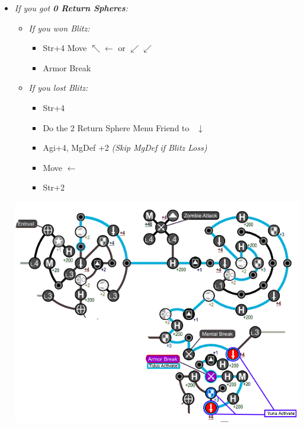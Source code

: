 \begin{spheregrid}
\begin{multicols}{2}
\begin{itemize}
\begin{itemize}
        \item \textit{If you got \textbf{0 Return Spheres}:}
              \begin{itemize}
              \item \textit{If you won Blitz:}
              \begin{itemize}
                \tidusf Move to Str+4 by Mental Break $\rightarrow x3, \downarrow, \rightarrow x3$
                \yunaf Friend Sphere to \tidus
                \item Str+4
                \tidusf Move $\nwarrow\leftarrow$ or $\swarrow\swarrow$
                \item Armor Break
                \end{itemize}
		\item \textit{If you lost Blitz:}
                \begin{itemize}
                \tidusf Move to Armor Break $\rightarrow x3, \downarrow x6$
                \tidusf Armor Break
                \tidusf Move to HP $\searrow\searrow$
                      \yunaf Friend Sphere to \tidus
                \item Str+4
                \item Do the 2 Return Sphere Menu
                \yunaf Friend to \rikku\ $\downarrow$
                \item Agi+4, MgDef +2 \textit{(Skip MgDef if Blitz Loss)}
                \item Move $\leftarrow$
                \item Str+2
                \end{itemize}
              \end{itemize}
              \includegraphics[width=.9\columnwidth]{graphics/0_returns}

\end{itemize}
\end{itemize}
\end{multicols}
\end{spheregrid}
